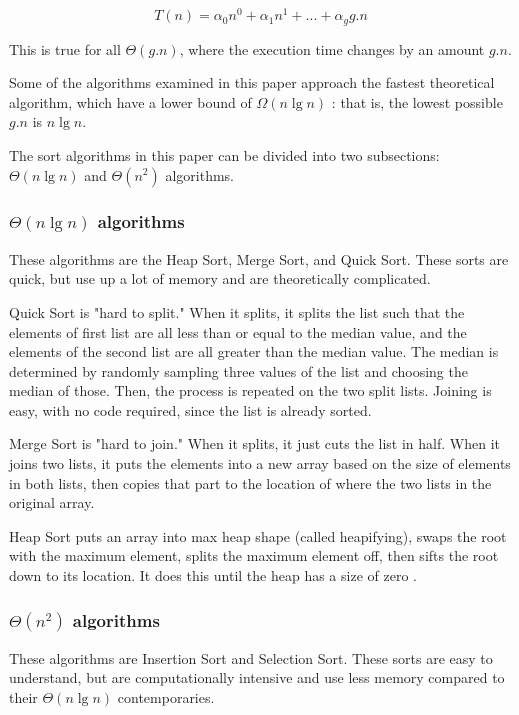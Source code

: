 \documentclass[10pt,fleqn]{article}
\begin{document}
$$
    T(n) = \alpha_0 n^0+ \alpha_1 n^1 + . . . + \alpha_g g.n
$$

This is true for all $\Theta(g.n)$, where the execution time changes by an amount $g.n$. 

Some of the algorithms examined in this paper approach the fastest theoretical algorithm, which have a lower bound of $\Omega(n\lg n)$ \cite{dp4ds}: that is, the lowest possible $g.n$ is $n\lg n$.

The sort algorithms in this paper can be divided into two subsections: $\Theta(n\lg n)$ and $\Theta(n^2)$ algorithms.

\subsubsection{$\Theta(n\lg n)$ algorithms}

These algorithms are the Heap Sort, Merge Sort, and Quick Sort. These sorts are quick, but use up a lot of memory and are theoretically complicated. 

Quick Sort is "hard to split." When it splits, it splits the list such that the elements of first list are all less than or equal to the median value, and the elements of the second list are all greater than the median value. The median is determined by randomly sampling three values of the list and choosing the median of those. Then, the process is repeated on the two split lists. Joining is easy, with no code required, since the list is already sorted.

Merge Sort is "hard to join." When it splits, it just cuts the list in half. When it joins two lists, it puts the elements into a new array based on the size of elements in both lists, then copies that part to the location of where the two lists in the original array.

Heap Sort puts an array into max heap shape (called heapifying), swaps the root with the maximum element, splits the maximum element off, then sifts the root down to its location. It does this until the heap has a size of zero \cite{GeeksforGeeks_Heap}.

\subsubsection{$\Theta(n^2)$ algorithms}

These algorithms are Insertion Sort and Selection Sort. These sorts are easy to understand, but are computationally intensive and use less memory compared to their $\Theta(n \lg n)$ contemporaries.
\end{document}
